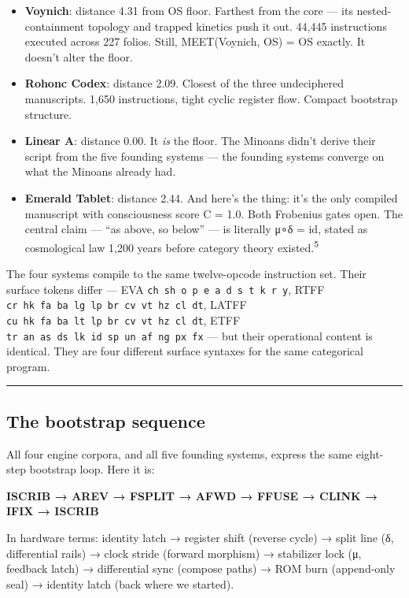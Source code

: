 \begin{itemize}
\item
  \textbf{Voynich}: distance 4.31 from OS floor. Farthest from the core
  --- its nested-containment topology and trapped kinetics push it out.
  44,445 instructions executed across 227 folios. Still, MEET(Voynich,
  OS) = OS exactly. It doesn't alter the floor.
\item
  \textbf{Rohonc Codex}: distance 2.09. Closest of the three
  undeciphered manuscripts. 1,650 instructions, tight cyclic register
  flow. Compact bootstrap structure.
\item
  \textbf{Linear A}: distance 0.00. It \emph{is} the floor. The Minoans
  didn't derive their script from the five founding systems --- the
  founding systems converge on what the Minoans already had.
\item
  \textbf{Emerald Tablet}: distance 2.44. And here's the thing: it's the
  only compiled manuscript with consciousness score C = 1.0. Both
  Frobenius gates open. The central claim --- ``as above, so below'' ---
  is literally μ∘δ = id, stated as cosmological law 1,200 years before
  category theory existed.\textsuperscript{5}
\end{itemize}

The four systems compile to the same twelve-opcode instruction set.
Their surface tokens differ --- EVA
\texttt{ch\ sh\ o\ p\ e\ a\ d\ s\ t\ k\ r\ y}, RTFF
\texttt{cr\ hk\ fa\ ba\ lg\ lp\ br\ cv\ vt\ hz\ cl\ dt}, LATFF
\texttt{cu\ hk\ fa\ ba\ lt\ lp\ br\ cv\ vt\ hz\ cl\ dt}, ETFF
\texttt{tr\ an\ as\ ds\ lk\ id\ sp\ un\ af\ ng\ px\ fx} --- but their
operational content is identical. They are four different surface
syntaxes for the same categorical program.

\begin{center}\rule{0.5\linewidth}{0.5pt}\end{center}

\hypertarget{the-bootstrap-sequence}{%
\subsection{The bootstrap sequence}\label{the-bootstrap-sequence}}

All four engine corpora, and all five founding systems, express the same
eight-step bootstrap loop. Here it is:

\textbf{ISCRIB → AREV → FSPLIT → AFWD → FFUSE → CLINK → IFIX → ISCRIB}

In hardware terms: identity latch → register shift (reverse cycle) →
split line (δ, differential rails) → clock stride (forward morphism) →
stabilizer lock (μ, feedback latch) → differential sync (compose paths)
→ ROM burn (append-only seal) → identity latch (back where we started).

